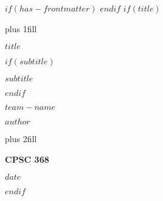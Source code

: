 $if(has-frontmatter)$
\frontmatter
$endif$
$if(title)$
\clearpage
\thispagestyle{empty}
{\centering
\hbox{}\vskip 0cm plus 1fill
{\Huge\bfseries $title$ \par}
$if(subtitle)$
\vspace{3ex}
{\Large\bfseries $subtitle$ \par}
$endif$
\vspace{12ex}
{\Large $team-name$ \par} 
\vspace{6ex}
{\Large\bfseries $author$ \par}
\vskip 0cm plus 2fill
{\bfseries\large CPSC 368 \par}
\vspace{3ex}
{\bfseries\large $date$ \par}
\par}
\clearpage
$endif$

\clearpage
